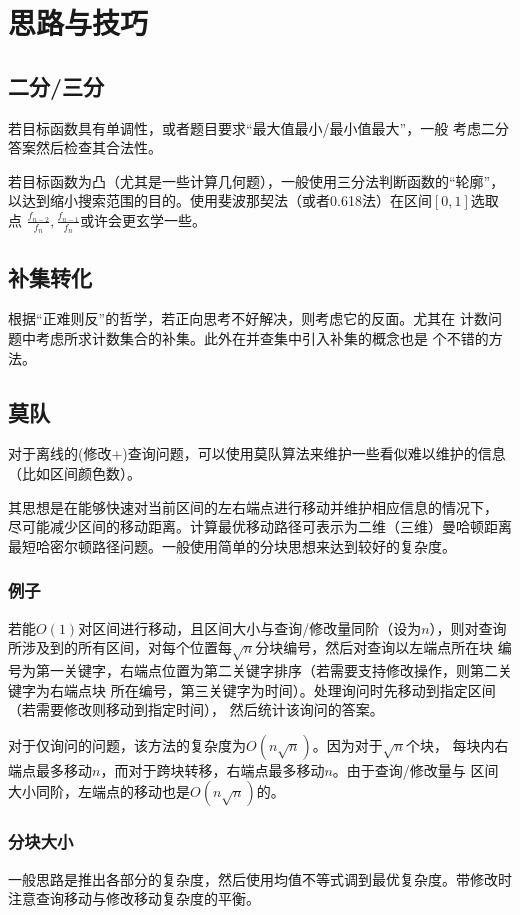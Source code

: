 \section{思路与技巧}
\subsection{二分/三分}
若目标函数具有单调性，或者题目要求``最大值最小/最小值最大''，一般
考虑二分答案然后检查其合法性。

若目标函数为凸（尤其是一些计算几何题），一般使用三分法判断函数的``轮廓''，
以达到缩小搜索范围的目的。使用斐波那契法（或者0.618法）在区间$[0,1]$选取点
$\frac{f_{n-2}}{f_n},\frac{f_{n-1}}{f_n}$或许会更玄学一些。
\subsection{补集转化}
根据``正难则反''的哲学，若正向思考不好解决，则考虑它的反面。尤其在
计数问题中考虑所求计数集合的补集。此外在并查集中引入补集的概念也是
个不错的方法。
\subsection{莫队}
对于离线的(修改+)查询问题，可以使用莫队算法来维护一些看似难以维护的信息
（比如区间颜色数）。

其思想是在能够快速对当前区间的左右端点进行移动并维护相应信息的情况下，
尽可能减少区间的移动距离。计算最优移动路径可表示为二维（三维）曼哈顿距离
最短哈密尔顿路径问题。一般使用简单的分块思想来达到较好的复杂度。

\subsubsection{例子}
若能$O(1)$对区间进行移动，且区间大小与查询/修改量同阶（设为$n$），则对查询
所涉及到的所有区间，对每个位置每$\sqrt{n}$分块编号，然后对查询以左端点所在块
编号为第一关键字，右端点位置为第二关键字排序（若需要支持修改操作，则第二关键字为右端点块
所在编号，第三关键字为时间）。处理询问时先移动到指定区间（若需要修改则移动到指定时间），
然后统计该询问的答案。

对于仅询问的问题，该方法的复杂度为$O(n\sqrt{n})$。因为对于$\sqrt{n}$个块，
每块内右端点最多移动$n$，而对于跨块转移，右端点最多移动$n$。由于查询/修改量与
区间大小同阶，左端点的移动也是$O(n\sqrt{n})$的。
\subsubsection{分块大小}
一般思路是推出各部分的复杂度，然后使用均值不等式调到最优复杂度。带修改时
注意查询移动与修改移动复杂度的平衡。
